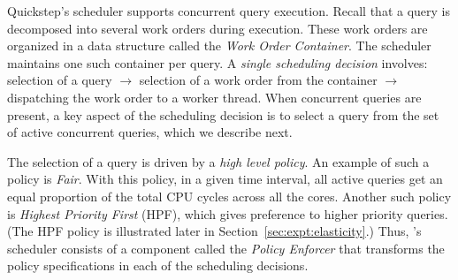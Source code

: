 
Quickstep's scheduler supports concurrent query execution. Recall that a query is decomposed into several work orders during execution. These work orders are organized in a data structure called the \textit{Work Order Container}. The scheduler maintains one such container per query. A \textit{single scheduling decision} involves: selection of a query $\rightarrow$ selection of a work order from the container $\rightarrow$ dispatching the work order to a worker thread. When concurrent queries are present, a key aspect of the scheduling decision is to select a query from the set of active concurrent queries, which we describe next.

The selection of a query is driven by a \textit{high level policy}. An example of such a policy is \textit{Fair}. With this policy, in a given time interval, all active queries get an equal proportion of the total CPU cycles across all the cores. Another such policy is \textit{Highest Priority First} (HPF), which gives preference to higher priority queries. (The HPF policy is illustrated later in Section~\ref{sec:expt:elasticity}.) Thus, \Quickstep's scheduler consists of a component called the \textit{Policy Enforcer} that transforms the policy specifications in each of the scheduling decisions.

